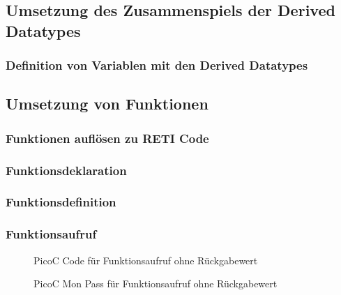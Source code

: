 \subsection{Umsetzung des Zusammenspiels der Derived Datatypes}
\subsubsection{Definition von Variablen mit den Derived Datatypes}

\subsection{Umsetzung von Funktionen}
\subsubsection{Funktionen auflösen zu RETI Code}
\subsubsection{Funktionsdeklaration}
\subsubsection{Funktionsdefinition}
\subsubsection{Funktionsaufruf}
\begin{figure}[H]
  \centering
  \caption{PicoC Code für Funktionsaufruf ohne Rückgabewert}
  \label{fig:picoc_code_für_funktionsaufruf_ohne_rückgabewert}
\end{figure}

\begin{figure}[H]
  \centering
  \caption{PicoC Mon Pass für Funktionsaufruf ohne Rückgabewert}
  \label{fig:picoc_mon_pass_für_funktionsaufruf_ohne_rückgabewert}
\end{figure}

